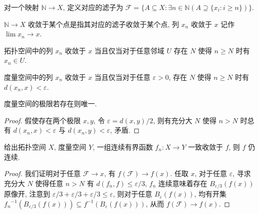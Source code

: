 \begin{definition}
    对一个映射 \(\mathbb{N} \to X\), 定义对应的滤子为 \(\mathcal{F} = \{A \subseteq X : \exists n \in \mathbb{N} (A \supseteq \{x_i : i \ge n\})\}\).
\end{definition}

\begin{definition}
    \(\mathbb{N} \to X\) 收敛于某个点是指其对应的滤子收敛于某个点, 列 \(x_n\) 收敛于 \(x\) 记作 \(\lim x_n \to x\).
\end{definition}

\begin{corollary}
    拓扑空间中的列 \(x_n\) 收敛于 \(x\) 当且仅当对于任意邻域 \(U\) 存在 \(N\) 使得 \(n \ge N\) 时有 \(x_n \in U\).
\end{corollary}

\begin{corollary}
    度量空间中的列 \(x_n\) 收敛于 \(x\) 当且仅当对于任意 \(\varepsilon > 0\), 存在 \(N\) 使得 \(n \ge N\) 时有 \(d(x_n,x) < \varepsilon\).
\end{corollary}

\begin{lemma}
    度量空间的极限若存在则唯一.

    \begin{proof}
        假使存在两个极限 \(x,y\), 令 \(\varepsilon = d(x,y)/2\), 则有充分大 \(N\) 使得 \(n>N\) 时总有 \(d(x_n,x) < \varepsilon\) 与 \(d(x_n,y) < \varepsilon\), 矛盾.
    \end{proof}
\end{lemma}

\begin{theorem}
    \label {theorem:weierstrass uniform convergence}
    给出拓扑空间 \(X\), 度量空间 \(Y\), 一组连续有界函数 \(f_n : X \to Y\) 一致收敛于 \(f\), 则 \(f\) 仍连续.

    \begin{proof}
        我们证明对于任意 \(\mathcal{F} \to x\), 有 \(f (\mathcal{F}) \to f(x)\).
        任取 \(x\), 对于任意 \(\varepsilon\), 寻求充分大 \(N\) 使得任意 \(n>N\) 有 \(d (f_n,f) \le \varepsilon/3\),
        \(f_n\) 连续意味着存在 \(B_{\varepsilon/3} (f(x))\) 原像开, 注意到 \(\varepsilon/3+\varepsilon/3+\varepsilon/3 \le \varepsilon\), 则对于任意 \(B_{\varepsilon} (f(x))\),
        均有开集 \({f_n}^{-1} (B_{\varepsilon/3} (f(x))) \subseteq f^{-1} (B_{\varepsilon} (f(x)))\), 
        从而 \(f (\mathcal{F}) \to f(x)\).
    \end{proof}
\end{theorem}

